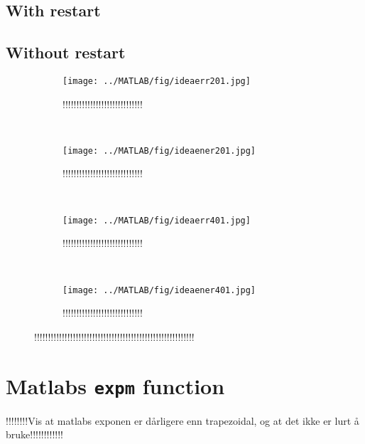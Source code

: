\subsection{With restart} %

\subsection{Without restart}
\begin{figure}[H]
        \centering
        \begin{subfigure}[b]{0.30\textwidth}
                \texttt{[image: ../MATLAB/fig/ideaerr201.jpg]}
                \caption{ !!!!!!!!!!!!!!!!!!!!!!!!!!!!! }
                \label{fig:ideaerr201}
        \end{subfigure}%
        ~
        \begin{subfigure}[b]{0.30\textwidth}
                \texttt{[image: ../MATLAB/fig/ideaener201.jpg]}
                \caption{ !!!!!!!!!!!!!!!!!!!!!!!!!!!!! }
                \label{fig:ideaener201}
        \end{subfigure}
        ~
        
		\begin{subfigure}[b]{0.30\textwidth}
                \texttt{[image: ../MATLAB/fig/ideaerr401.jpg]}
                \caption{ !!!!!!!!!!!!!!!!!!!!!!!!!!!!! }
                \label{fig:ideaerr401}
        \end{subfigure}%
        ~
        \begin{subfigure}[b]{0.30\textwidth}
                \texttt{[image: ../MATLAB/fig/ideaener401.jpg]}
                \caption{ !!!!!!!!!!!!!!!!!!!!!!!!!!!!! }
                \label{fig:ideaener401}
        \end{subfigure}
        
        \caption{!!!!!!!!!!!!!!!!!!!!!!!!!!!!!!!!!!!!!!!!!!!!!!!!!!!!!!!!!!}
        \label{fig:idea1}
\end{figure}

\section{Matlabs \texttt{expm} function} %

!!!!!!!!Vis at matlabs exponen er dårligere enn trapezoidal, og at det ikke er lurt å bruke!!!!!!!!!!!!\\


